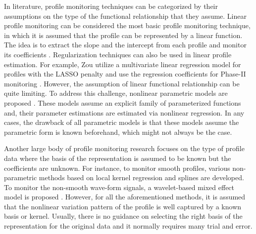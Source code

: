 \documentclass[journal, peerreview]{IEEEtran}
\begin{document}
In literature, profile monitoring techniques can be categorized by their assumptions on the type of the functional relationship that they assume.
Linear profile monitoring can be considered the most basic profile monitoring technique, in which it is assumed that the profile can be represented by a  linear function. The idea is to extract the slope and the intercept from each profile and monitor its coefficients \cite{zhu2009monitoring}. 
Regularization techniques can also be used in linear profile estimation. For example, Zou \etal utilize a multivariate linear regression model for profiles with the LASSO penalty and use the regression coefficients for Phase-II monitoring \cite{zou2012lasso}.
However, the assumption of linear functional relationship can be quite limiting.
To address this challenge, nonlinear parametric models are proposed \cite{Williams2007-ty,Jensen2009-tu,Noorossana2011-oj,Maleki2018-uo}.
These models assume an explicit family of parameterized functions and, their parameter estimations are estimated via nonlinear regression. In any cases, the drawback of all parametric models is that these models assume the parametric form is known beforehand, which might not always be the case.

Another large body of profile monitoring research focuses on the type of profile data where the basis of the representation is assumed to be known but the coefficients are unknown. 
For instance, to monitor smooth profiles, various non-parametric methods based on local kernel regression \cite{zou2008monitoring,qiu2010nonparametric,zou2009nonparametric} and splines \cite{chang2010statistical} are developed. 
To monitor the non-smooth wave-form signals, a wavelet-based mixed effect model is proposed
\cite{paynabar2011characterization}. 
However, for all the aforementioned methods, it is assumed that the nonlinear variation pattern of the profile is well captured by a known basis or kernel.
Usually, there is no guidance on selecting the right basis of the representation for the original data and it normally requires many trial and error. 
\end{document}
